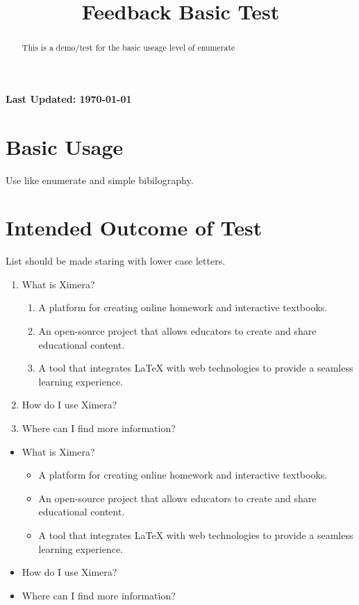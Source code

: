 \documentclass{ximera}
\title{Feedback Basic Test}
\begin{document}
\begin{abstract}
    This is a demo/test for the basic useage level of enumerate
\end{abstract}
\maketitle

{{\Huge \bfseries Last Updated: \today}} \\

\section{Basic Usage}
Use like enumerate and simple bibilography.



\section{Intended Outcome of Test}

List should be made staring with lower case letters.

\begin{enumerate}
    \item What is Ximera?
    \begin{enumerate}
        \item A platform for creating online homework and interactive textbooks.
        \item An open-source project that allows educators to create and share educational content.
        \item A tool that integrates LaTeX with web technologies to provide a seamless learning experience.
    \end{enumerate}
    \item How do I use Ximera?
    \item Where can I find more information?
\end{enumerate}


\begin{itemize}
    \item What is Ximera?
    \begin{itemize}
        \item A platform for creating online homework and interactive textbooks.
        \item An open-source project that allows educators to create and share educational content.
        \item A tool that integrates LaTeX with web technologies to provide a seamless learning experience.
    \end{itemize}
    \item How do I use Ximera?
    \item Where can I find more information?
\end{itemize}
\end{document}
